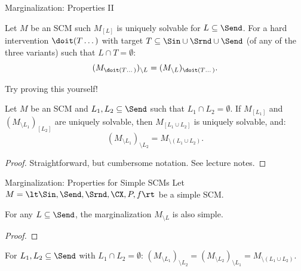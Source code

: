 \begin{frame}{Marginalization: Properties II}
  \begin{Prp}[\ref{prp:interventions_marginalizations_commute}]
    Let $M$ be an SCM such $M_{[L]}$ is uniquely solvable for $L \subseteq \Send$.
    For a hard intervention $\doit(T\dots)$ with target $T \subseteq \Sin \cup \Srnd \cup \Send$ (of any of the three variants) such that $L \cap T = \emptyset$:
    $$(M_{\doit(T\dots)})_{\setminus L} = (M_{\setminus L})_{\doit(T\dots)}.$$
\end{Prp}
Try proving this yourself!

\begin{Prp}[\ref{prp:marginalization_commutes}]
  Let $M$ be an SCM and $L_1, L_2 \subseteq \Send$ such that $L_1 \cap L_2 = \emptyset$.
  If $M_{[L_1]}$ and $(M_{\setminus L_1})_{[L_2]}$ are uniquely solvable, then $M_{[L_1\cup L_2]}$ is uniquely solvable, and:
  $$(M_{\setminus L_1})_{\setminus L_2} = M_{\setminus (L_1\cup L_2)}.$$
\end{Prp}
\begin{proof}
  Straightforward, but cumbersome notation. See lecture notes.
\end{proof}
\end{frame}

\begin{frame}{Marginalization: Properties for Simple  SCMs}
Let $M = \lt \Sin, \Send, \Srnd, \CX, P, f \rt$ be a simple SCM.
\begin{Prp}[\ref{prp:marginalization_preserves_simplicity}]
  For any $L \subseteq \Send$, the marginalization $M_{\setminus L}$ is also simple.
\end{Prp}
\begin{proof}
\end{proof}
\begin{Cor}[\ref{cor:marginalization_commutes_simple_scm}]
  For $L_1, L_2 \subseteq \Send$ with $L_1 \cap L_2 = \emptyset$:
    $(M_{\setminus L_1})_{\setminus L_2} = (M_{\setminus L_2})_{\setminus L_1} = M_{\setminus (L_1 \cup L_2)}$.
\end{Cor}
\end{frame}

